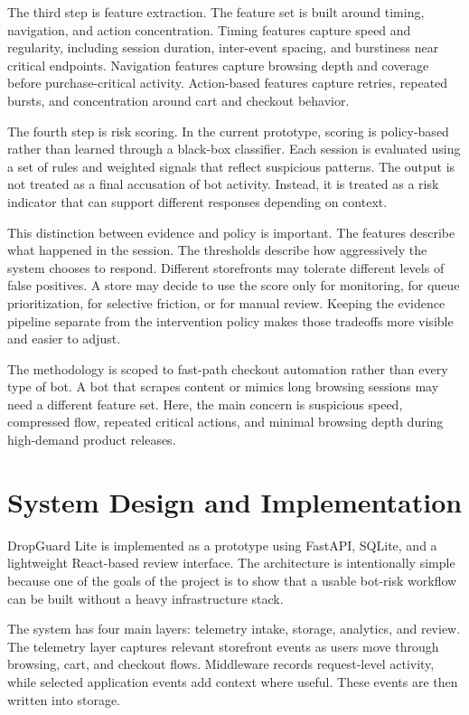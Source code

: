 \documentclass[12pt]{article}
\begin{document}
The third step is feature extraction. The feature set is built around timing, navigation, and action concentration. Timing features capture speed and regularity, including session duration, inter-event spacing, and burstiness near critical endpoints. Navigation features capture browsing depth and coverage before purchase-critical activity. Action-based features capture retries, repeated bursts, and concentration around cart and checkout behavior.

The fourth step is risk scoring. In the current prototype, scoring is policy-based rather than learned through a black-box classifier. Each session is evaluated using a set of rules and weighted signals that reflect suspicious patterns. The output is not treated as a final accusation of bot activity. Instead, it is treated as a risk indicator that can support different responses depending on context.

This distinction between evidence and policy is important. The features describe what happened in the session. The thresholds describe how aggressively the system chooses to respond. Different storefronts may tolerate different levels of false positives. A store may decide to use the score only for monitoring, for queue prioritization, for selective friction, or for manual review. Keeping the evidence pipeline separate from the intervention policy makes those tradeoffs more visible and easier to adjust.

The methodology is scoped to fast-path checkout automation rather than every type of bot. A bot that scrapes content or mimics long browsing sessions may need a different feature set. Here, the main concern is suspicious speed, compressed flow, repeated critical actions, and minimal browsing depth during high-demand product releases.

\section{System Design and Implementation}
DropGuard Lite is implemented as a prototype using FastAPI, SQLite, and a lightweight React-based review interface. The architecture is intentionally simple because one of the goals of the project is to show that a usable bot-risk workflow can be built without a heavy infrastructure stack.

The system has four main layers: telemetry intake, storage, analytics, and review. The telemetry layer captures relevant storefront events as users move through browsing, cart, and checkout flows. Middleware records request-level activity, while selected application events add context where useful. These events are then written into storage.
\end{document}
